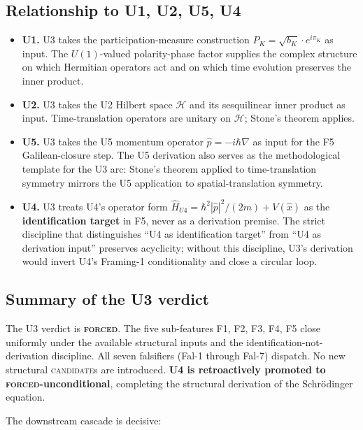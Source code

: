 \documentclass[11pt,a4paper]{article}
\begin{document}
\subsection{Relationship to U1, U2, U5, U4}

\begin{itemize}
  \item \textbf{U1.} U3 takes the participation-measure construction $P_K = \sqrt{b_K} \cdot e^{i\pi_K}$ as input. The $U(1)$-valued polarity-phase factor supplies the complex structure on which Hermitian operators act and on which time evolution preserves the inner product.
  \item \textbf{U2.} U3 takes the U2 Hilbert space $\mathcal{H}$ and its sesquilinear inner product as input. Time-translation operators are unitary on $\mathcal{H}$; Stone's theorem applies.
  \item \textbf{U5.} U3 takes the U5 momentum operator $\hat{p} = -i\hbar\nabla$ as input for the F5 Galilean-closure step. The U5 derivation also serves as the methodological template for the U3 arc: Stone's theorem applied to time-translation symmetry mirrors the U5 application to spatial-translation symmetry.
  \item \textbf{U4.} U3 treats U4's operator form $\hat{H}_{U4} = \hbar^2|\hat{p}|^2/(2m) + V(\hat{x})$ as the \textbf{identification target} in F5, never as a derivation premise. The strict discipline that distinguishes ``U4 as identification target'' from ``U4 as derivation input'' preserves acyclicity; without this discipline, U3's derivation would invert U4's Framing-1 conditionality and close a circular loop.
\end{itemize}

\subsection{Summary of the U3 verdict}

The U3 verdict is \textbf{\textsc{forced}}. The five sub-features F1, F2, F3, F4, F5 close uniformly under the available structural inputs and the identification-not-derivation discipline. All seven falsifiers (Fal-1 through Fal-7) dispatch. No new structural \textsc{candidate}s are introduced. \textbf{U4 is retroactively promoted to \textsc{forced}-unconditional}, completing the structural derivation of the Schr\"odinger equation.

The downstream cascade is decisive:
\end{document}

